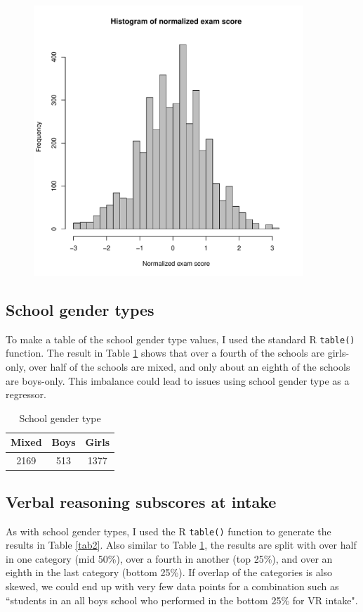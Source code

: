 \documentclass{article}
\begin{document}
\begin{figure}[H]
\centering
\includegraphics[width = 4in]{figures/histogram_4.pdf}
\caption{}
\label{hist4}
\end{figure}

\subsection{School gender types}
To make a table of the school gender type values, I used the standard R \verb|table()| function. The result in Table \ref{tab1} shows that over a fourth of the schools are girls-only, over half of the schools are mixed, and only about an eighth of the schools are boys-only. This imbalance could lead to issues using school gender type as a regressor.

\begin{table}[H]
\centering
\caption{School gender type}
\label{tab1}
\begin{tabular}{@{}  c c c@{}}
\textbf{Mixed} & \textbf{Boys} & \textbf{Girls} \\\midrule
 2169  & 513 & 1377 \\
\bottomrule
\hline
\end{tabular}
\end{table}

\subsection{Verbal reasoning subscores at intake}
As with school gender types, I used the R \verb|table()| function to generate the results in Table \ref{tab2}. Also similar to Table \ref{tab1}, the results are split with over half in one category (mid 50\%), over a fourth in another (top 25\%), and over an eighth in the last category (bottom 25\%). If overlap of the categories is also skewed, we could end up with very few data points for a combination such as ``students in an all boys school who performed in the bottom 25\% for VR intake".
\end{document}
